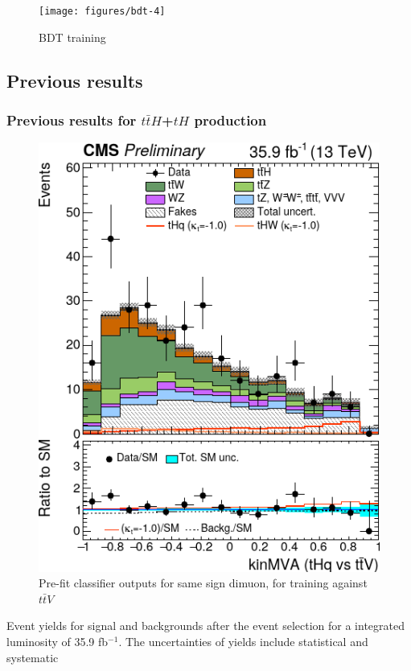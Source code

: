 \documentclass[11pt]{beamer}
\newcommand{\nologo}{\setbeamertemplate{logo}{}}
\begin{document}
{\nologo
\begin{frame}
	\begin{figure}[ht]
		\centering
		\texttt{[image: figures/bdt-4]}
		\caption*{\scriptsize BDT training}
	\end{figure}
\end{frame}}

{\nologo
\begin{frame}
\subsection{Previous results}
\frametitle{Previous results for $t\bar{t}H$+$tH$ production}
\begin{minipage}[c]{0.45\textwidth}
\begin{figure}
	\centering
	\includegraphics[scale=0.3]{figures/histo.png}
	\caption*{\tiny{Pre-fit classifier outputs for same sign dimuon, for training against $t\bar{t}V$ }}
\end{figure}
\end{minipage}
\hfill
\begin{minipage}[c]{.45\textwidth}
	\small
\begin{table}
	\centering
	\caption*{\tiny{Event yields for signal and backgrounds after the event selection for a integrated luminosity of 35.9 fb$^{-1}$. The uncertainties of yields include statistical and systematic \protect \footnotemark} }

\end{table}
\end{minipage}
\end{frame}}
\end{document}
